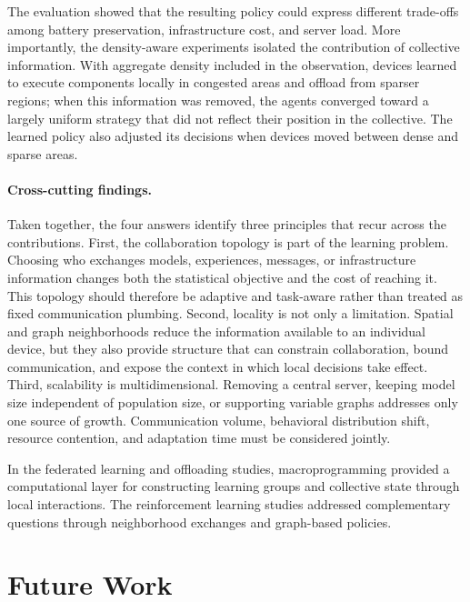 The evaluation showed that the resulting policy could express different
 trade-offs among battery preservation, infrastructure cost, and server load.
%
More importantly, the density-aware experiments isolated the contribution of
 collective information. 
% 
With aggregate density included in the observation,
 devices learned to execute components locally in congested areas and offload from
 sparser regions; when this information was removed, the agents converged toward a
 largely uniform strategy that did not reflect their position in the collective.
%
The learned policy also adjusted its decisions when devices moved between dense
 and sparse areas.

\paragraph{Cross-cutting findings.}
Taken together, the four answers identify three principles that recur across the
contributions.
%
First, the collaboration topology is part of the learning problem. Choosing who
exchanges models, experiences, messages, or infrastructure information changes
both the statistical objective and the cost of reaching it. This topology should
therefore be adaptive and task-aware rather than treated as fixed communication
plumbing.
%
Second, locality is not only a limitation. Spatial and graph neighborhoods reduce
the information available to an individual device, but they also provide structure
that can constrain collaboration, bound communication, and expose the context in
which local decisions take effect.
%
Third, scalability is multidimensional. Removing a central server, keeping model
size independent of population size, or supporting variable graphs addresses only
one source of growth. Communication volume, behavioral distribution shift,
resource contention, and adaptation time must be considered jointly.

In the federated learning and offloading studies, macroprogramming provided
 a computational layer for constructing learning groups and collective state
 through local interactions. The reinforcement learning studies addressed
 complementary questions through neighborhood exchanges and graph-based policies.




\section{Future Work}
\label{sec:future-work}

